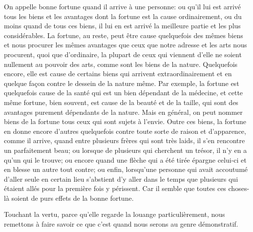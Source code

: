 On appelle bonne fortune quand il arrive à une personne: ou qu'il lui est arrivé tous les biens et les avantages dont la
fortune est la cause ordinairement, ou du moins quand de tous ces biens, il lui en est arrivé la meilleure partie et les
plus considérables. La fortune, au reste, peut être cause quelquefois des mêmes biens et nous procurer les mêmes avantages
que ceux que notre adresse et les arts nous procurent, quoi que d'ordinaire, la plupart de ceux qui viennent d'elle ne
soient nullement au pouvoir des arts, comme sont les biens de la nature. Quelquefois encore, elle est cause de certains
biens qui arrivent extraordinairement et en quelque façon contre le dessein de la nature même. Par exemple, la fortune est
quelquefois cause de la santé qui est un bien dépendant de la médecine, et cette même fortune, bien souvent, est cause de
la beauté et de la taille, qui sont des avantages purement dépendants de la nature. Mais en général, on peut nommer biens
de la fortune tous ceux qui sont sujets à l'envie. Outre ces biens, la fortune en donne encore d'autres quelquefois contre
toute sorte de raison et d'apparence, comme il arrive, quand entre plusieurs frères qui sont très laids, il s'en rencontre
un parfaitement beau; ou lorsque de plusieurs qui cherchent un trésor, il n'y en a qu'un qui le trouve; ou encore quand
une flèche qui a été tirée épargne celui-ci et en blesse un autre tout contre; ou enfin, lorsqu'une personne qui avait
accoutumé d'aller seule en certain lieu s'abstient d'y aller dans le temps que plusieurs qui étaient allés pour la première
fois y périssent. Car il semble que toutes ces choses-là soient de purs effets de la bonne fortune.

\bigbreak

Touchant la vertu, parce qu'elle regarde la louange particulièrement, nous remettons à faire savoir ce que c'est quand nous
serons au genre démonstratif.
